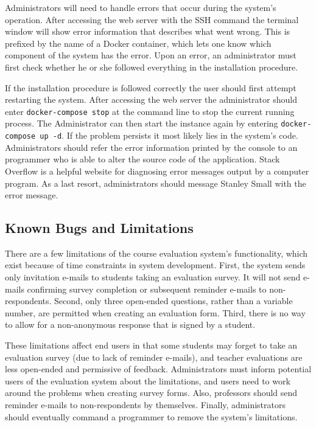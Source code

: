 \documentclass{article}
\begin{document}
Administrators will need to handle errors that occur during the system's operation. After accessing the web server with the SSH command the terminal window will show error information that describes what went wrong. This is prefixed by the name of a Docker container, which lets one know which component of the system has the error. Upon an error, an administrator must first check whether he or she followed everything in the installation procedure.

If the installation procedure is followed correctly the user should first attempt restarting the system.  After accessing the web server the administrator should enter \verb|docker-compose stop| at the command line to stop the current running process.  The Administrator can then start the instance again by entering \verb|docker-compose up -d|.  If the problem persists it most likely lies in the system's code. Administrators should refer the error information printed by the console to an programmer who is able to alter the source code of the application. Stack Overflow is a helpful website for diagnosing error messages output by a computer program. As a last resort, administrators should message Stanley Small with the error message.

\subsection{Known Bugs and Limitations}

There are a few limitations of the course evaluation system's functionality, which exist because of time constraints in system development. First, the system sends only invitation e-mails to students taking an evaluation survey. It will not send e-mails confirming survey completion or subsequent reminder e-mails to non-respondents. Second, only three open-ended questions, rather than a variable number, are permitted when creating an evaluation form. Third, there is no way to allow for a non-anonymous response that is signed by a student.

These limitations affect end users in that some students may forget to take an evaluation survey (due to lack of reminder e-mails), and teacher evaluations are less open-ended and permissive of feedback. Administrators must inform potential users of the evaluation system about the limitations, and users need to work around the problems when creating survey forms. Also, professors should send reminder e-mails to non-respondents by themselves. Finally, administrators should eventually command a programmer to remove the system's limitations.
\end{document}
